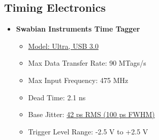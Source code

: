 \subsection*{Timing Electronics}
\begin{itemize}
    \item \textbf{Swabian Instruments Time Tagger}
    \begin{itemize}\footnotesize
        \item \href{https://www.swabianinstruments.com/static/documentation/TimeTagger/}{Model: Ultra, USB 3.0}
        \item Max Data Transfer Rate: 90 MTags/s
        \item Max Input Frequency: 475 MHz
        \item Dead Time: 2.1 ns
        \item Base Jitter: \href{https://www.swabianinstruments.com/static/downloads/TimeTaggerSeries.pdf}{42 ps RMS (100 ps FWHM)}
        \item Trigger Level Range: -2.5 V to +2.5 V
    \end{itemize}
    
\end{itemize}

